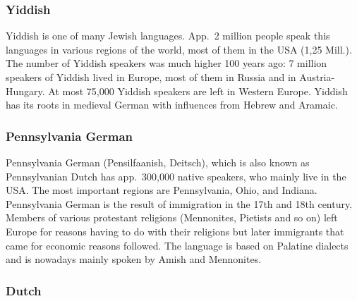 


\subsubsection{Yiddish}

Yiddish is one of many Jewish languages. App.\ 2 million people speak this languages in various
regions of the world, most of them in the USA (1,25 Mill.). The number of Yiddish speakers was much
higher 100 years ago: 7 million speakers of Yiddish lived in Europe, most of them in Russia and in
Austria-Hungary. At most 75,000 Yiddish speakers are left in Western Europe. Yiddish has its roots
in medieval German with influences from Hebrew and Aramaic.




\subsubsection{Pennsylvania German}

Pennsylvania German (Pensilfaanish, Deitsch), which is also known as Pennsylvanian Dutch has app.\ 300,000
native speakers, who mainly live in the USA. The most important regions are Pennsylvania, Ohio, and
Indiana. Pennsylvania German is the result of immigration in the 17th and 18th century. Members of
various protestant religions (Mennonites, Pietists and so on) left Europe for reasons having to do
with their religions but later immigrants that came for economic reasons followed.  The language is
based on Palatine dialects and is nowadays mainly spoken by Amish and Mennonites.




\subsubsection{Dutch}


